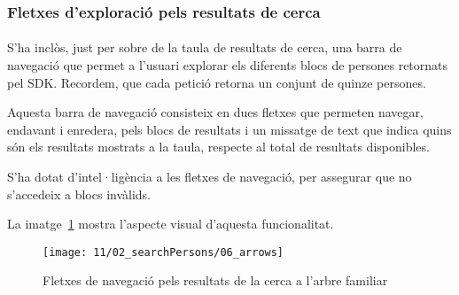 \subsubsection{Fletxes d'exploració pels resultats de cerca}

\paragraph{}
S'ha inclòs, just per sobre de la taula de resultats de cerca, una barra de navegació que permet a l'usuari explorar els diferents blocs de persones retornats pel SDK. Recordem, que cada petició retorna un conjunt de quinze persones.

Aquesta barra de navegació consisteix en dues fletxes que permeten navegar, endavant i enredera, pels blocs de resultats i un missatge de text que indica quins són els resultats mostrats a la taula, respecte al total de resultats disponibles.

S'ha dotat d’intel·ligència a les fletxes de navegació, per assegurar que no s'acce\-deix a blocs invàlids.

La imatge~\ref{fig:arrowsPersonSearch} mostra l’aspecte visual d’aquesta funcionalitat.

\begin{figure}[h]
    \texttt{[image: 11/02\_searchPersons/06\_arrows]}
    \centering
    \caption{Fletxes de navegació pels resultats de la cerca a l'arbre familiar}\label{fig:arrowsPersonSearch}
\end{figure}
